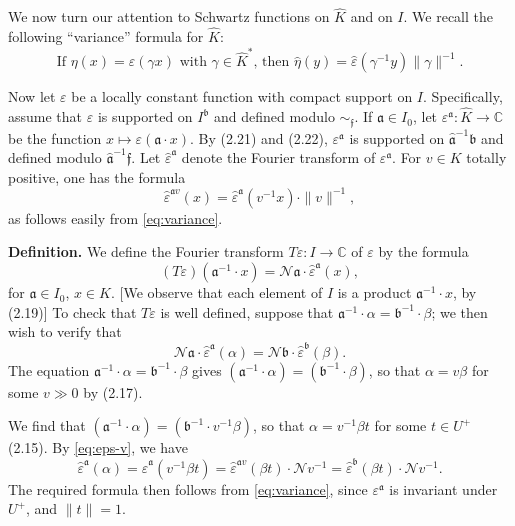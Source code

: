 \documentclass[12pt,a4paper]{article}
\theoremstyle{plain}
\theoremstyle{definition}
\newcommand{\ff}{\mathfrak{f}}
\newcommand{\C}{\mathbb{C}}
\begin{document}
We now turn our attention to Schwartz functions on $\hat{K}$ and on $I$. We recall the following ``variance'' formula for $\hat{K}$:
\begin{equation}\label{eq:variance}
\text{If $\eta(x)=\varepsilon(\gamma x)$ with $\gamma\in\hat{K}^*$, then $\hat{\eta}(y)=\hat{\varepsilon}(\gamma^{-1}y)\|\gamma\|^{-1}$.}
\end{equation}

Now let $\varepsilon$ be a locally constant function with compact support on $I$. Specifically, assume that $\varepsilon$ is supported on $I^{\mathfrak{b}}$ and defined modulo $\sim_{\ff}$. If $\mathfrak{a}\in I_0$, let $\varepsilon^{\mathfrak{a}}:\hat{K}\to\C$ be the function $x\mapsto\varepsilon(\mathfrak{a}\cdot x)$. By (2.21) and (2.22), $\varepsilon^{\mathfrak{a}}$ is supported on $\hat{\mathfrak{a}}^{-1}\mathfrak{b}$ and defined modulo $\hat{\mathfrak{a}}^{-1}\ff$. Let $\hat{\varepsilon}^{\mathfrak{a}}$ denote the Fourier transform of $\varepsilon^{\mathfrak{a}}$. For $v\in K$ totally positive, one has the formula
\begin{equation}\label{eq:eps-v}
\hat{\varepsilon}^{\mathfrak{a}v}(x)=\hat{\varepsilon}^{\mathfrak{a}}(v^{-1}x)\cdot\|v\|^{-1},
\end{equation}
as follows easily from \eqref{eq:variance}.

\textbf{Definition.} We define the Fourier transform $T\varepsilon:I\to\C$ of $\varepsilon$ by the formula
\begin{equation}\label{eq:T-transform}
(T\varepsilon)(\mathfrak{a}^{-1}\cdot x)=\mathcal{N}\mathfrak{a}\cdot\hat{\varepsilon}^{\mathfrak{a}}(x),
\end{equation}
for $\mathfrak{a}\in I_0$, $x\in\hat{K}$. [We observe that each element of $I$ is a product $\mathfrak{a}^{-1}\cdot x$, by (2.19)] To check that $T\varepsilon$ is well defined, suppose that $\mathfrak{a}^{-1}\cdot\alpha=\mathfrak{b}^{-1}\cdot\beta$; we then wish to verify that
\[
\mathcal{N}\mathfrak{a}\cdot\hat{\varepsilon}^{\mathfrak{a}}(\alpha)=\mathcal{N}\mathfrak{b}\cdot\hat{\varepsilon}^{\mathfrak{b}}(\beta).
\]
The equation $\mathfrak{a}^{-1}\cdot\alpha=\mathfrak{b}^{-1}\cdot\beta$ gives $(\mathfrak{a}^{-1}\cdot\alpha)=(\mathfrak{b}^{-1}\cdot\beta)$, so that $\alpha=v\beta$ for some $v\gg0$ by (2.17).

We find that $(\mathfrak{a}^{-1}\cdot\alpha)=(\mathfrak{b}^{-1}\cdot v^{-1}\beta)$, so that $\alpha=v^{-1}\beta t$ for some $t\in U^+$ (2.15). By \eqref{eq:eps-v}, we have
\[
\hat{\varepsilon}^{\mathfrak{a}}(\alpha)=\hat{\varepsilon}^{\mathfrak{a}}(v^{-1}\beta t)=\hat{\varepsilon}^{\mathfrak{a}v}(\beta t)\cdot\mathcal{N}v^{-1}=\hat{\varepsilon}^{\mathfrak{b}}(\beta t)\cdot\mathcal{N}v^{-1}.
\]
The required formula then follows from \eqref{eq:variance}, since $\varepsilon^{\mathfrak{a}}$ is invariant under $U^+$, and $\|t\|=1$.
\end{document}
